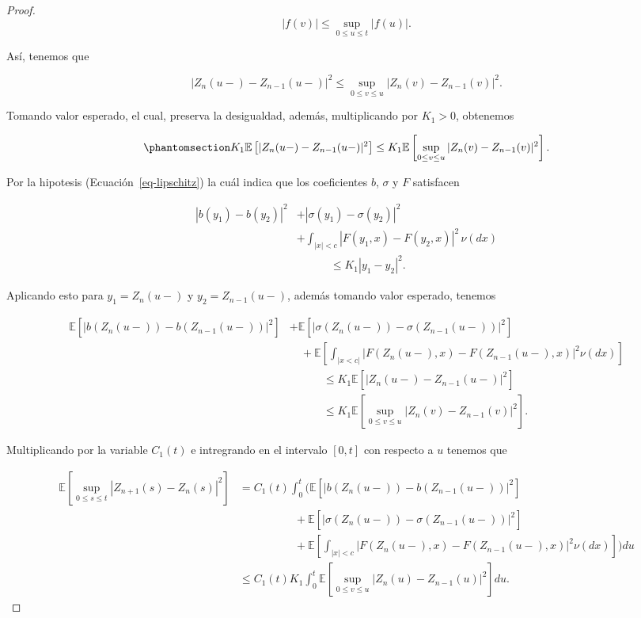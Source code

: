 \documentclass[
  spanish,
  us-letterpaper,
]{scrreprt}
\theoremstyle{plain}
\theoremstyle{plain}
\theoremstyle{definition}
\theoremstyle{plain}
\theoremstyle{remark}
\begin{document}
\begin{proof}
\[
    |f(v)|\leq \sup\limits_{0\leq u\leq t}|f(u)|.
\]

Así, tenemos que

\[
    |Z_n(u-)-Z_{n-1}(u-)|^2\leq \sup\limits_{0\leq v\leq u}|Z_n(v)-Z_{n-1}(v)|^2.
\]

Tomando valor esperado, el cual, preserva la desigualdad, además,
multiplicando por \(K_1>0\), obtenemos

\begin{equation}\phantomsection\label{eq-12}{
    K_1\mathbb{E}\left[|Z_n(u-)-Z_{n-1}(u-)|^2\right] \leq K_1\mathbb{E}\left[\sup\limits_{0\leq v\leq u}|Z_n(v)-Z_{n-1}(v)|^2\right].
}\end{equation}

Por la hipotesis (Ecuación~\ref{eq-lipschitz}) la cuál indica que los
coeficientes \(b\), \(\sigma\) y \(F\) satisfacen

\[
    \begin{aligned}
    |b(y_1) - b(y_2)|^2 & + |\sigma(y_1) - \sigma(y_2)|^2\\ 
    & + \int_{|x| < c} |F(y_1, x) - F(y_2, x)|^2 \, \nu(dx) \\
    &\qquad \quad \leq K_1 |y_1 - y_2|^2.
    \end{aligned}
\]

Aplicando esto para \(y_1=Z_n(u-)\) y \(y_2=Z_{n-1}(u-)\), además
tomando valor esperado, tenemos

\[
    \begin{aligned}
        \mathbb{E}\left[|b(Z_n(u-))-b(Z_{n-1}(u-))|^2\right] & + \mathbb{E}\left[|\sigma(Z_n(u-))-\sigma(Z_{n-1}(u-))|^2\right]\\ 
        & \quad + \mathbb{E}\left[\int_{|x<c|}|F(Z_n(u-),x)-F(Z_{n-1}(u-),x)|^2\nu(dx)\right]\\ 
        & \qquad\quad \leq K_1 \mathbb{E}\left[|Z_n(u-)-Z_{n-1}(u-)|^2\right]\\ 
        & \qquad\quad \leq K_1\mathbb{E}\left[\sup\limits_{0\leq v\leq u}|Z_n(v)-Z_{n-1}(v)|^2\right].
    \end{aligned}
\]

Multiplicando por la variable \(C_1(t)\) e intregrando en el intervalo
\([0,t]\) con respecto a \(u\) tenemos que

\[
    \begin{aligned}
        \mathbb{E}\left[\sup\limits_{0\leq s\leq t}|Z_{n+1}(s)-Z_n(s)|^2\right] & = C_1(t)\int_0^t \Bigg(\mathbb{E}\left[|b(Z_n(u-))-b(Z_{n-1}(u-))|^2\right]\\ 
        & \qquad\qquad\quad + \mathbb{E}\left[|\sigma(Z_n(u-))-\sigma(Z_{n-1}(u-))|^2\right]\\ 
        & \qquad\qquad\quad + \mathbb{E}\left[\int_{|x|<c}|F(Z_n(u-),x)-F(Z_{n-1}(u-),x)|^2\nu(dx)\right]\Bigg)du\\ 
        & \leq C_1(t) K_1\int_0^t \mathbb{E}\left[\sup\limits_{0\leq v\leq u}|Z_n(u)-Z_{n-1}(u)|^2\right]du.
    \end{aligned}
\]


\end{proof}
\end{document}
